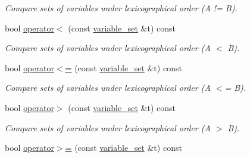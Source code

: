 \begin{DoxyCompactItemize}
\begin{DoxyCompactList}\small\item\em Compare sets of variables under lexicographical order (A != B). \end{DoxyCompactList}\item 
bool \hyperlink{classmerlin_1_1variable__set_a8862b4409496bc7f4bbf75619b6ac4d1}{operator$<$} (const \hyperlink{classmerlin_1_1variable__set}{variable\+\_\+set} \&t) const \hypertarget{classmerlin_1_1variable__set_a8862b4409496bc7f4bbf75619b6ac4d1}{}\label{classmerlin_1_1variable__set_a8862b4409496bc7f4bbf75619b6ac4d1}

\begin{DoxyCompactList}\small\item\em Compare sets of variables under lexicographical order (A $<$ B). \end{DoxyCompactList}\item 
bool \hyperlink{classmerlin_1_1variable__set_a97e17e16c32ec7f1a90c5df1586c50c0}{operator$<$=} (const \hyperlink{classmerlin_1_1variable__set}{variable\+\_\+set} \&t) const \hypertarget{classmerlin_1_1variable__set_a97e17e16c32ec7f1a90c5df1586c50c0}{}\label{classmerlin_1_1variable__set_a97e17e16c32ec7f1a90c5df1586c50c0}

\begin{DoxyCompactList}\small\item\em Compare sets of variables under lexicographical order (A $<$= B). \end{DoxyCompactList}\item 
bool \hyperlink{classmerlin_1_1variable__set_ae5a0319dd097786bf5000ad29ef68c29}{operator$>$} (const \hyperlink{classmerlin_1_1variable__set}{variable\+\_\+set} \&t) const \hypertarget{classmerlin_1_1variable__set_ae5a0319dd097786bf5000ad29ef68c29}{}\label{classmerlin_1_1variable__set_ae5a0319dd097786bf5000ad29ef68c29}

\begin{DoxyCompactList}\small\item\em Compare sets of variables under lexicographical order (A $>$ B). \end{DoxyCompactList}\item 
bool \hyperlink{classmerlin_1_1variable__set_acf30f484b7ea666dab42908178c189ec}{operator$>$=} (const \hyperlink{classmerlin_1_1variable__set}{variable\+\_\+set} \&t) const \hypertarget{classmerlin_1_1variable__set_acf30f484b7ea666dab42908178c189ec}{}\label{classmerlin_1_1variable__set_acf30f484b7ea666dab42908178c189ec}


\end{DoxyCompactItemize}
